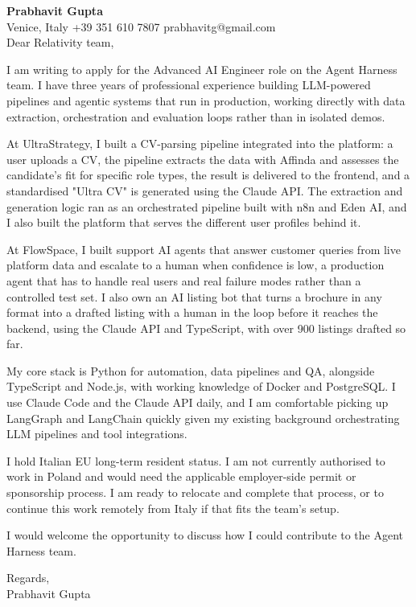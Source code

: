 \documentclass[a4paper,10.5pt]{article}
\begin{document}
\textbf{Prabhavit Gupta}\\
Venice, Italy \textbar{} +39 351 610 7807 \textbar{} prabhavitg@gmail.com\\[10pt]
Dear Relativity team,

I am writing to apply for the Advanced AI Engineer role on the Agent Harness team. I have three years of professional experience building LLM-powered pipelines and agentic systems that run in production, working directly with data extraction, orchestration and evaluation loops rather than in isolated demos.

At UltraStrategy, I built a CV-parsing pipeline integrated into the platform: a user uploads a CV, the pipeline extracts the data with Affinda and assesses the candidate's fit for specific role types, the result is delivered to the frontend, and a standardised "Ultra CV" is generated using the Claude API. The extraction and generation logic ran as an orchestrated pipeline built with n8n and Eden AI, and I also built the platform that serves the different user profiles behind it.

At FlowSpace, I built support AI agents that answer customer queries from live platform data and escalate to a human when confidence is low, a production agent that has to handle real users and real failure modes rather than a controlled test set. I also own an AI listing bot that turns a brochure in any format into a drafted listing with a human in the loop before it reaches the backend, using the Claude API and TypeScript, with over 900 listings drafted so far.

My core stack is Python for automation, data pipelines and QA, alongside TypeScript and Node.js, with working knowledge of Docker and PostgreSQL. I use Claude Code and the Claude API daily, and I am comfortable picking up LangGraph and LangChain quickly given my existing background orchestrating LLM pipelines and tool integrations.

I hold Italian EU long-term resident status. I am not currently authorised to work in Poland and would need the applicable employer-side permit or sponsorship process. I am ready to relocate and complete that process, or to continue this work remotely from Italy if that fits the team's setup.

I would welcome the opportunity to discuss how I could contribute to the Agent Harness team.

Regards,\\
Prabhavit Gupta
\end{document}
